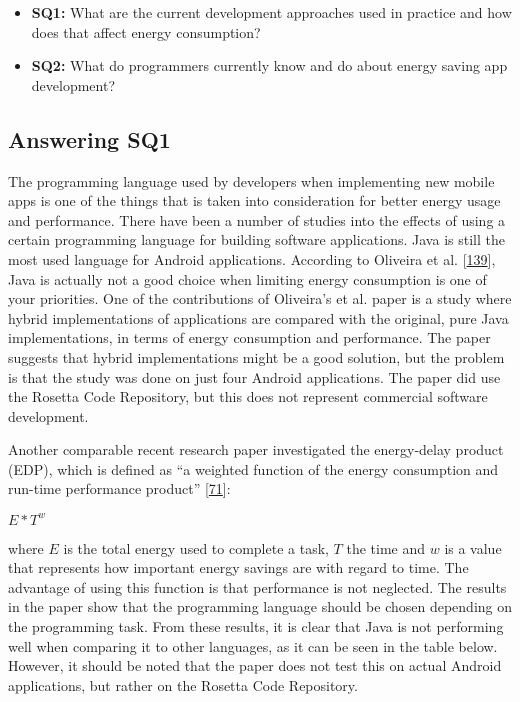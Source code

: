 \documentclass[]{book}
\providecommand{\tightlist}{%
  \setlength{\itemsep}{0pt}\setlength{\parskip}{0pt}}
\begin{document}
\begin{itemize}
\tightlist
\item
  \textbf{SQ1:} What are the current development approaches used in
  practice and how does that affect energy consumption?
\item
  \textbf{SQ2:} What do programmers currently know and do about energy
  saving app development?
\end{itemize}

\subsection{Answering SQ1}\label{answering-sq1}

The programming language used by developers when implementing new mobile
apps is one of the things that is taken into consideration for better
energy usage and performance. There have been a number of studies into
the effects of using a certain programming language for building
software applications. Java is still the most used language for Android
applications. According to Oliveira et al.
{[}\protect\hyperlink{ref-OOC2017}{139}{]}, Java is actually not a good
choice when limiting energy consumption is one of your priorities. One
of the contributions of Oliveira's et al. paper is a study where hybrid
implementations of applications are compared with the original, pure
Java implementations, in terms of energy consumption and performance.
The paper suggests that hybrid implementations might be a good solution,
but the problem is that the study was done on just four Android
applications. The paper did use the Rosetta Code Repository, but this
does not represent commercial software development.

Another comparable recent research paper investigated the energy-delay
product (EDP), which is defined as ``a weighted function of the energy
consumption and run-time performance product''
{[}\protect\hyperlink{ref-GKLS2018}{71}{]}:

\(E * T^w\)

where \(E\) is the total energy used to complete a task, \(T\) the time
and \(w\) is a value that represents how important energy savings are
with regard to time. The advantage of using this function is that
performance is not neglected. The results in the paper show that the
programming language should be chosen depending on the programming task.
From these results, it is clear that Java is not performing well when
comparing it to other languages, as it can be seen in the table below.
However, it should be noted that the paper does not test this on actual
Android applications, but rather on the Rosetta Code Repository.
\end{document}
